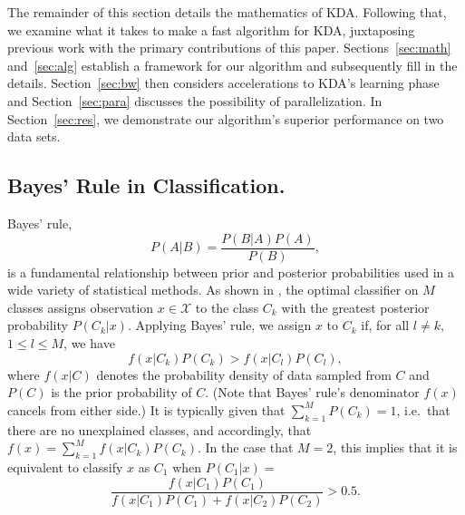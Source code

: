 \documentclass[twoside,leqno,twocolumn]{article}
\begin{document}
The remainder of this section details the mathematics of KDA.
Following that, we examine what it takes to make a fast algorithm for
KDA, juxtaposing previous work with the primary contributions of this
paper.  Sections~\ref{sec:math} and~\ref{sec:alg} establish a
framework for our algorithm and subsequently fill in the details.
Section~\ref{sec:bw} then considers accelerations to KDA's learning
phase and Section~\ref{sec:para} discusses the possibility of
parallelization.  In Section~\ref{sec:res}, we demonstrate our
algorithm's superior performance on two data sets.

\subsection{Bayes' Rule in Classification.}
Bayes' rule,
\begin{equation}
  P(A|B) = \frac{P(B|A)P(A)}{P(B)} ,
\end{equation}
is a fundamental relationship between prior and posterior
probabilities used in a wide variety of statistical methods.  As shown
in \cite{rao73}, the optimal classifier on $M$ classes assigns observation
$x \in \mathcal{X}$ to the class $C_k$ with the greatest posterior
probability $P(C_k|x)$.  Applying Bayes' rule, we assign $x$ to $C_k$
if, for all $l \neq k$, $1 \leq l \leq M$, we have
\begin{equation}\label{eqn:ineq-form}
  f(x|C_k)P(C_k) > f(x|C_l)P(C_l) ,
\end{equation}
where $f(x|C)$ denotes the probability density of data sampled from
$C$ and $P(C)$ is the prior probability of $C$.  (Note that Bayes'
rule's denominator $f(x)$ cancels from either side.)  It is typically
given that $\sum_{k=1}^M P(C_k) = 1$, i.e.~that there are no
unexplained classes, and accordingly, that $f(x) = \sum_{k=1}^M
f(x|C_k)P(C_k)$.  In the case that $M = 2$, this implies that it is
equivalent to classify $x$ as $C_1$ when $P(C_1|x) =$
\begin{equation}\label{eqn:prob-form}
  \frac{f(x|C_1)P(C_1)}{f(x|C_1)P(C_1) + f(x|C_2)P(C_2)} > 0.5 .
\end{equation}
\end{document}
